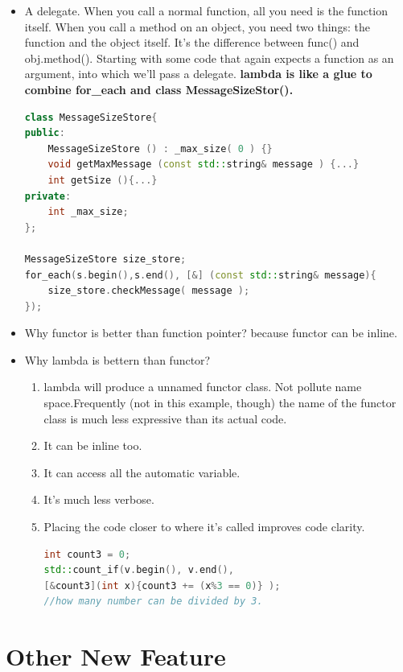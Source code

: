 \documentclass[a4paper,11pt,twoside]{book}
\begin{document}
\begin{itemize}
\item A delegate. When you call a normal function, all you need is the function itself. When you call a method on an object, you need two things: the function and the object itself. It's the difference between func() and obj.method(). Starting with some code that again expects a function as an argument, into which we'll pass a delegate. \textbf{lambda is like a glue to combine for\_each and class MessageSizeStor().}

\begin{lstlisting}[frame=single, language=c++]
class MessageSizeStore{
public:
    MessageSizeStore () : _max_size( 0 ) {}
    void getMaxMessage (const std::string& message ) {...}
    int getSize (){...}
private:
    int _max_size;
};

MessageSizeStore size_store;
for_each(s.begin(),s.end(), [&] (const std::string& message){
	size_store.checkMessage( message );
});
\end{lstlisting}

\item Why functor is better than function pointer? because functor can be inline. 

\item Why lambda is bettern than functor? 
\begin{enumerate}
\item lambda will produce a unnamed functor class. Not pollute name space.Frequently (not in this example, though) the name of the functor class is much less expressive than its actual code.
\item It can be inline too.
\item It can access all the automatic variable.
\item It's much less verbose.
\item Placing the code closer to where it's called improves code clarity.
\begin{lstlisting}[frame=single, language=c++]
int count3 = 0;
std::count_if(v.begin(), v.end(),
[&count3](int x){count3 += (x%3 == 0)} );
//how many number can be divided by 3.
\end{lstlisting}
\end{enumerate}
\end{itemize}


\section{Other New Feature}
\end{document}

